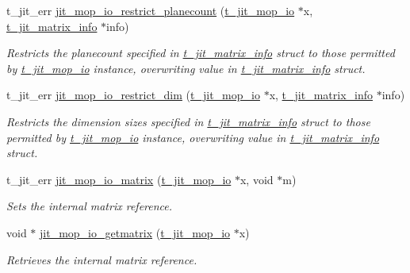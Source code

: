\begin{DoxyCompactItemize}
t\_\-jit\_\-err \hyperlink{group__mopmod_ga9cf9101515ddbe3ee3b4df7965e705f0}{jit\_\-mop\_\-io\_\-restrict\_\-planecount} (\hyperlink{structt__jit__mop__io}{t\_\-jit\_\-mop\_\-io} $\ast$x, \hyperlink{structt__jit__matrix__info}{t\_\-jit\_\-matrix\_\-info} $\ast$info)
\begin{DoxyCompactList}\small\item\em Restricts the planecount specified in \hyperlink{structt__jit__matrix__info}{t\_\-jit\_\-matrix\_\-info} struct to those permitted by \hyperlink{structt__jit__mop__io}{t\_\-jit\_\-mop\_\-io} instance, overwriting value in \hyperlink{structt__jit__matrix__info}{t\_\-jit\_\-matrix\_\-info} struct. \item\end{DoxyCompactList}\item 
t\_\-jit\_\-err \hyperlink{group__mopmod_ga8d5cb38974f12f1f7a140eadf36afacc}{jit\_\-mop\_\-io\_\-restrict\_\-dim} (\hyperlink{structt__jit__mop__io}{t\_\-jit\_\-mop\_\-io} $\ast$x, \hyperlink{structt__jit__matrix__info}{t\_\-jit\_\-matrix\_\-info} $\ast$info)
\begin{DoxyCompactList}\small\item\em Restricts the dimension sizes specified in \hyperlink{structt__jit__matrix__info}{t\_\-jit\_\-matrix\_\-info} struct to those permitted by \hyperlink{structt__jit__mop__io}{t\_\-jit\_\-mop\_\-io} instance, overwriting value in \hyperlink{structt__jit__matrix__info}{t\_\-jit\_\-matrix\_\-info} struct. \item\end{DoxyCompactList}\item 
t\_\-jit\_\-err \hyperlink{group__mopmod_gaebb33ac5825a27e42c476faf8724d6de}{jit\_\-mop\_\-io\_\-matrix} (\hyperlink{structt__jit__mop__io}{t\_\-jit\_\-mop\_\-io} $\ast$x, void $\ast$m)
\begin{DoxyCompactList}\small\item\em Sets the internal matrix reference. \item\end{DoxyCompactList}\item 
void $\ast$ \hyperlink{group__mopmod_ga9d85ffd0468e137ca0b87bd1ecfb98b4}{jit\_\-mop\_\-io\_\-getmatrix} (\hyperlink{structt__jit__mop__io}{t\_\-jit\_\-mop\_\-io} $\ast$x)
\begin{DoxyCompactList}\small\item\em Retrieves the internal matrix reference. \item\end{DoxyCompactList}\item 

\end{DoxyCompactItemize}
